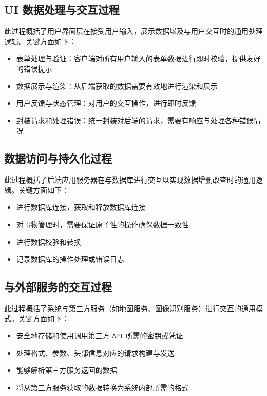 \documentclass[12pt,a4paper,UTF8]{article}
\begin{document}
\subsection{UI 数据处理与交互过程}

此过程概括了用户界面层在接受用户输入，展示数据以及与用户交互时的通用处理逻辑。关键方面如下：

\begin{itemize}[topsep=2pt, partopsep=0pt]
  \item 表单处理与验证：客户端对所有用户输入的表单数据进行即时校验，提供友好的错误提示
  \item 数据展示与渲染：从后端获取的数据需要有效地进行渲染和展示
  \item 用户反馈与状态管理：对用户的交互操作，进行即时反馈
  \item 封装请求和处理错误：统一封装对后端的请求，需要有响应与处理各种错误情况
\end{itemize}

\subsection{数据访问与持久化过程}

此过程概括了后端应用服务器在与数据库进行交互以实现数据增删改查时的通用逻辑。关键方面如下：

\begin{itemize}[topsep=2pt, partopsep=0pt]
  \item 进行数据库连接，获取和释放数据库连接
  \item 对事物管理时，需要保证原子性的操作确保数据一致性
  \item 进行数据校验和转换
  \item 记录数据库的操作处理或错误日志
\end{itemize}

\subsection{与外部服务的交互过程}

此过程概括了系统与第三方服务（如地图服务、图像识别服务）进行交互的通用模式。关键方面如下：

\begin{itemize}[topsep=2pt, partopsep=0pt]
  \item 安全地存储和使用调用第三方 \verb|API| 所需的密钥或凭证
  \item 处理格式、参数、头部信息对应的请求构建与发送
  \item 能够解析第三方服务返回的数据
  \item 将从第三方服务获取的数据转换为系统内部所需的格式
\end{itemize}
\end{document}
